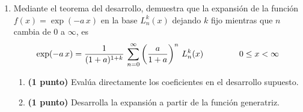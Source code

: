 \begin{enumerate}
\begin{enumerate}
\end{enumerate}
\item Mediante el teorema del desarrollo, demuestra que la expansión de la función $f(x) = \exp(- a \, x)$ en la base $L_{n}^{k} (x)$ dejando $k$ fijo mientras que $n$ cambia de $0$ a $\infty$, es
\begin{align*}
\exp(-a \, x) = \dfrac{1}{(1 + a)^{1 + k}} \, \sum_{n=0}^{\infty} \left( \dfrac{a}{1 + a} \right)^{n} \, L_{n}^{k} (x) \hspace{1.5cm} 0 \leq x < \infty
\end{align*}
\begin{enumerate}
\item \textbf{(1 punto) } Evalúa directamente los coeficientes en el desarrollo supuesto.
\item \textbf{(1 punto) } Desarrolla la expansión a partir de la función generatriz.
\end{enumerate}
\end{enumerate}
